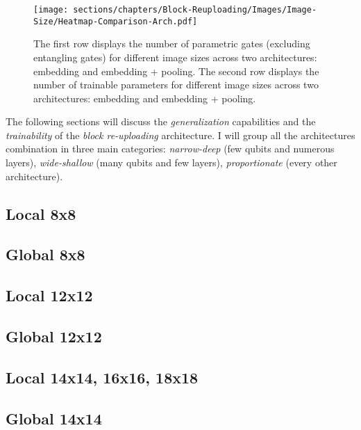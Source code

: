 \begin{figure}[h]
    \centering
    \texttt{[image: sections/chapters/Block-Reuploading/Images/Image-Size/Heatmap-Comparison-Arch.pdf]}
    \caption{The first row displays the number of parametric gates (excluding entangling gates) for 
    different image sizes across two architectures: embedding and embedding + pooling.
    The second row displays the number of trainable parameters for 
    different image sizes across two architectures: embedding and embedding + pooling.}
    \label{arc:embed-pooling}
\end{figure}


The following sections will discuss the \textit{generalization} capabilities and the 
\textit{trainability} of the \textit{block re-uploading} architecture.
I will group all the architectures combination in three main categories: \textit{narrow-deep} 
(few qubits and numerous layers), \textit{wide-shallow} (many qubits and few layers), \textit{proportionate}
(every other architecture). 


\subsection{Local 8x8} \label{sssec:num1}


\subsection{Global 8x8}


\subsection{Local 12x12} \label{sssec:local-12}


\subsection{Global 12x12}


\subsection{Local 14x14, 16x16, 18x18}


\subsection{Global 14x14}


